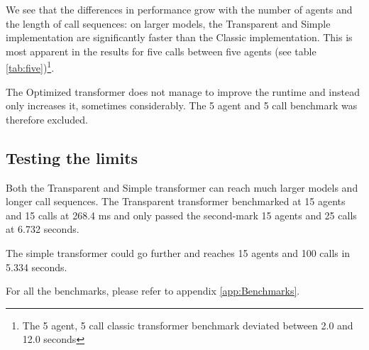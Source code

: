 We see that the differences in performance grow with the number of agents and the length of call sequences:
on larger models, the Transparent and Simple implementation are significantly faster than the Classic implementation.
This is most apparent in the results for five calls between five agents (see table \ref{tab:five})\footnote{The 5 agent, 5 call classic transformer benchmark deviated between 2.0 and 12.0 seconds}.

The Optimized transformer does not manage to improve the runtime and instead only increases it, sometimes considerably.
The 5 agent and 5 call benchmark was therefore excluded.

\subsection{Testing the limits}
Both the Transparent and Simple transformer can reach much larger models and longer call sequences.
The Transparent transformer benchmarked at 15 agents and 15 calls at 268.4 ms and only passed the second-mark 15 agents and 25 calls at 6.732 seconds.

The simple transformer could go further and reaches 15 agents and 100 calls in 5.334 seconds.

For all the benchmarks, please refer to appendix \ref{app:Benchmarks}.
